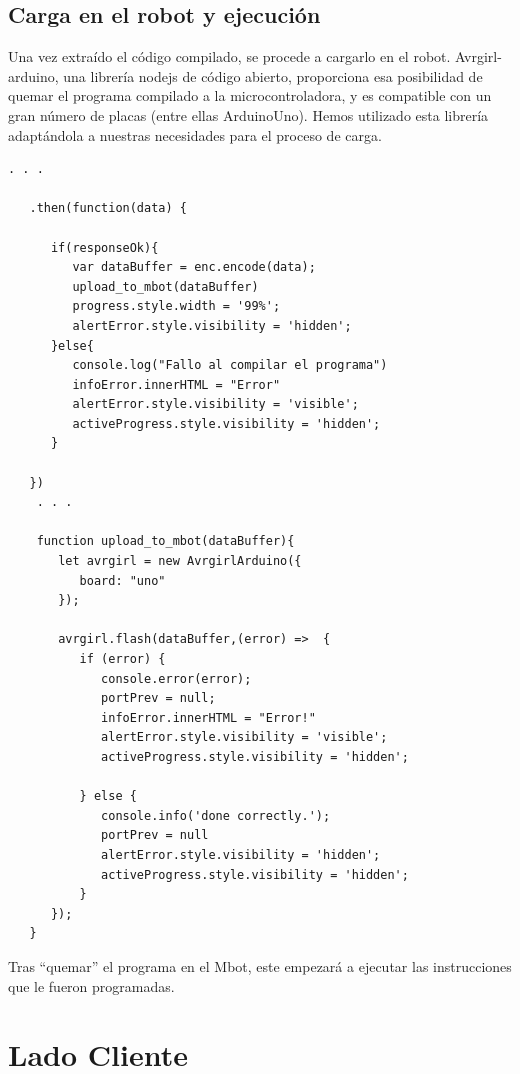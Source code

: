 \documentclass{report}
\begin{document}
\subsection{Carga en el robot y ejecución}

Una vez extraído el código compilado, se procede a cargarlo en el robot. Avrgirl-arduino, una librería nodejs de código abierto, proporciona esa posibilidad de quemar el programa compilado a la microcontroladora, y es compatible con un gran número de placas (entre ellas ArduinoUno). Hemos utilizado esta librería adaptándola a nuestras necesidades para el proceso de carga.
\\
\begin{lstlisting}[frame=single,breaklines=true, label=Carga del compilado al Mbot, caption=Carga del compilado al Mbot, captionpos=b]
   . . . 
   
   .then(function(data) {

      if(responseOk){
         var dataBuffer = enc.encode(data);
         upload_to_mbot(dataBuffer)
         progress.style.width = '99%';
         alertError.style.visibility = 'hidden';
      }else{
         console.log("Fallo al compilar el programa")
         infoError.innerHTML = "Error"
         alertError.style.visibility = 'visible';
         activeProgress.style.visibility = 'hidden';
      }

   })
    . . . 
    
    function upload_to_mbot(dataBuffer){
       let avrgirl = new AvrgirlArduino({
          board: "uno"
       });

       avrgirl.flash(dataBuffer,(error) =>  {
          if (error) {
             console.error(error);
             portPrev = null;
             infoError.innerHTML = "Error!"
             alertError.style.visibility = 'visible';
             activeProgress.style.visibility = 'hidden';

          } else {
             console.info('done correctly.');
             portPrev = null
             alertError.style.visibility = 'hidden';
             activeProgress.style.visibility = 'hidden';
          }
      });
   }

\end{lstlisting}
Tras “quemar” el programa en el Mbot, este empezará a ejecutar las instrucciones que le fueron programadas.

\section{Lado Cliente}
\end{document}
